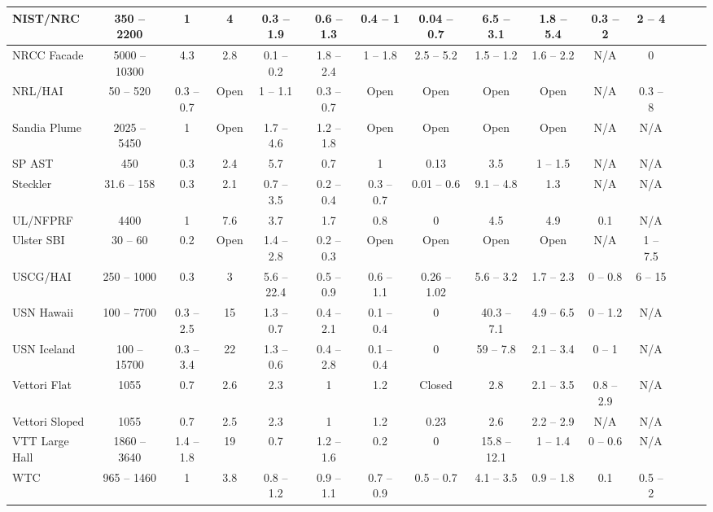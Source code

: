 \begin{table}
\begin{center}
\begin{tabular}{|l|c|c|c|c|c|c|c|c|c|c|c|c|c|c|}
NIST/NRC   & 350 -- 2200   & 1   & 4   & 0.3 -- 1.9   & 0.6 -- 1.3   & 0.4 -- 1   & 0.04 -- 0.7   & 6.5 -- 3.1   & 1.8 -- 5.4   & 0.3 -- 2   & 2 -- 4   \\ \hline 
NRCC Facade  & 5000 -- 10300   & 4.3   & 2.8   & 0.1 -- 0.2   & 1.8 -- 2.4   & 1 -- 1.8   & 2.5 -- 5.2   & 1.5 -- 1.2   & 1.6 -- 2.2   & N/A   & 0   \\ \hline 
NRL/HAI  & 50 -- 520   & 0.3 -- 0.7   & Open  & 1 -- 1.1   & 0.3 -- 0.7   & Open  & Open  &Open   & Open   & N/A   & 0.3 -- 8   \\ \hline 
Sandia Plume  & 2025 -- 5450   & 1   & Open  & 1.7 -- 4.6   & 1.2 -- 1.8   & Open  & Open  &Open   & Open   & N/A   & N/A   \\ \hline 
SP AST  & 450   & 0.3   & 2.4   & 5.7   & 0.7   & 1   & 0.13   & 3.5   & 1 -- 1.5   & N/A   & N/A   \\ \hline 
Steckler  & 31.6 -- 158   & 0.3   & 2.1   & 0.7 -- 3.5   & 0.2 -- 0.4   & 0.3 -- 0.7   & 0.01 -- 0.6   & 9.1 -- 4.8   & 1.3   & N/A   & N/A   \\ \hline 
UL/NFPRF  & 4400   & 1   & 7.6   & 3.7   & 1.7   & 0.8   & 0   & 4.5   & 4.9   & 0.1   & N/A   \\ \hline 
Ulster SBI  & 30 -- 60   & 0.2   & Open  & 1.4 -- 2.8   & 0.2 -- 0.3   & Open  & Open  &Open   & Open   & N/A   & 1 -- 7.5   \\ \hline 
USCG/HAI  & 250 -- 1000   & 0.3   & 3   & 5.6 -- 22.4   & 0.5 -- 0.9   & 0.6 -- 1.1   & 0.26 -- 1.02   & 5.6 -- 3.2   & 1.7 -- 2.3   & 0 -- 0.8   & 6 -- 15   \\ \hline 
USN Hawaii  & 100 -- 7700   & 0.3 -- 2.5   & 15   & 1.3 -- 0.7   & 0.4 -- 2.1   & 0.1 -- 0.4   & 0   & 40.3 -- 7.1   & 4.9 -- 6.5   & 0 -- 1.2   & N/A   \\ \hline 
USN Iceland  & 100 -- 15700   & 0.3 -- 3.4   & 22   & 1.3 -- 0.6   & 0.4 -- 2.8   & 0.1 -- 0.4   & 0   & 59 -- 7.8   & 2.1 -- 3.4   & 0 -- 1   & N/A   \\ \hline 
Vettori Flat  & 1055   & 0.7   & 2.6   & 2.3   & 1   & 1.2   & Closed   & 2.8   & 2.1 -- 3.5   & 0.8 -- 2.9   & N/A   \\ \hline 
Vettori Sloped  & 1055   & 0.7   & 2.5   & 2.3   & 1   & 1.2   & 0.23   & 2.6   & 2.2 -- 2.9   & N/A   & N/A   \\ \hline 
VTT Large Hall  & 1860 -- 3640   & 1.4 -- 1.8   & 19   & 0.7   & 1.2 -- 1.6   & 0.2   & 0   & 15.8 -- 12.1   & 1 -- 1.4   & 0 -- 0.6   & N/A   \\ \hline 
WTC   & 965 -- 1460   & 1   & 3.8   & 0.8 -- 1.2   & 0.9 -- 1.1   & 0.7 -- 0.9   & 0.5 -- 0.7   & 4.1 -- 3.5   & 0.9 -- 1.8   & 0.1   & 0.5 -- 2   \\ \hline 
\end{tabular}
\end{center}
\label{Test_Parameters}
\nopagebreak
\end{table}

